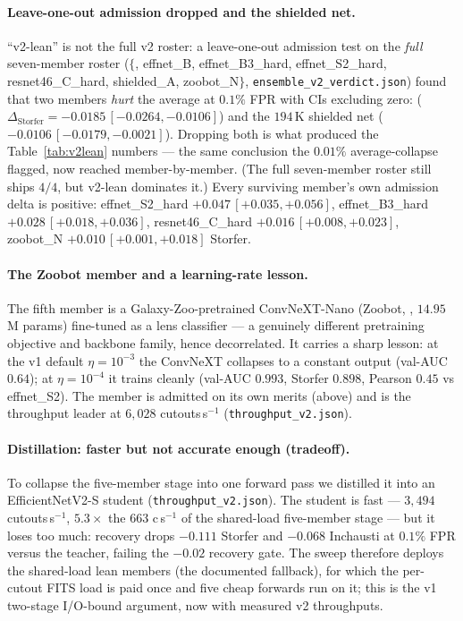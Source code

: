 \paragraph{Leave-one-out admission dropped \aion{} and the shielded net.}
``v2-lean'' is not the full v2 roster: a leave-one-out admission test on the
\emph{full} seven-member roster
($\{$\aion{}, effnet\_B, effnet\_B3\_hard, effnet\_S2\_hard, resnet46\_C\_hard,
shielded\_A, zoobot\_N$\}$, \texttt{ensemble\_v2\_verdict.json}) found that two members
\emph{hurt} the average at $0.1\%$ FPR with CIs excluding zero: \aion{}
($\Delta_{\mathrm{Storfer}}=-0.0185\,[-0.0264,-0.0106]$) and the $194$\,K shielded
net ($-0.0106\,[-0.0179,-0.0021]$). Dropping both is what produced the
Table~\ref{tab:v2lean} numbers --- the same conclusion the $0.01\%$ average-collapse
flagged, now reached member-by-member. (The full seven-member roster still ships
$4/4$, but v2-lean dominates it.) Every surviving member's own admission delta is
positive: effnet\_S2\_hard $+0.047\,[+0.035,+0.056]$, effnet\_B3\_hard
$+0.028\,[+0.018,+0.036]$, resnet46\_C\_hard $+0.016\,[+0.008,+0.023]$, zoobot\_N
$+0.010\,[+0.001,+0.018]$ Storfer.

\paragraph{The Zoobot member and a learning-rate lesson.} The fifth member is a
Galaxy-Zoo-pretrained ConvNeXT-Nano (Zoobot, \citealt{walmsley2023zoobot},
$14.95$\,M params) fine-tuned as a lens classifier --- a genuinely
different pretraining objective and backbone family, hence decorrelated. It carries
a sharp lesson: at the v1 default $\eta{=}10^{-3}$ the ConvNeXT collapses to a
constant output (val-AUC $0.64$); at $\eta{=}10^{-4}$ it trains cleanly (val-AUC
$0.993$, Storfer $0.898$, Pearson $0.45$ vs effnet\_S2). The member is
admitted on its own merits (above) and is the throughput leader at
$6{,}028$ cutouts\,s$^{-1}$ (\texttt{throughput\_v2.json}).

\paragraph{Distillation: faster but not accurate enough (tradeoff).} To collapse the
five-member stage into one forward pass we distilled it into an EfficientNetV2-S
student (\texttt{throughput\_v2.json}). The student is fast --- $3{,}494$
cutouts\,s$^{-1}$, $5.3\times$ the $663$ c\,s$^{-1}$ of the shared-load five-member
stage --- but it loses too much: recovery drops $-0.111$ Storfer and $-0.068$
Inchausti at $0.1\%$ FPR versus the teacher, failing the $-0.02$ recovery gate. The
sweep therefore deploys the shared-load lean members (the documented fallback), for
which the per-cutout FITS load is paid once and five cheap forwards run on it; this
is the v1 two-stage I/O-bound argument, now with measured v2 throughputs.

